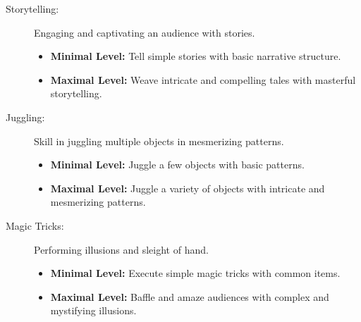 \begin{description}
    \item[Storytelling:] Engaging and captivating an audience with stories.
        \begin{itemize}
            \item \textbf{Minimal Level:} Tell simple stories with basic narrative structure.
            \item \textbf{Maximal Level:} Weave intricate and compelling tales with masterful storytelling.
        \end{itemize}

    \item[Juggling:] Skill in juggling multiple objects in mesmerizing patterns.
        \begin{itemize}
            \item \textbf{Minimal Level:} Juggle a few objects with basic patterns.
            \item \textbf{Maximal Level:} Juggle a variety of objects with intricate and mesmerizing patterns.
        \end{itemize}

    \item[Magic Tricks:] Performing illusions and sleight of hand.
        \begin{itemize}
            \item \textbf{Minimal Level:} Execute simple magic tricks with common items.
            \item \textbf{Maximal Level:} Baffle and amaze audiences with complex and mystifying illusions.
        \end{itemize}
\end{description}
